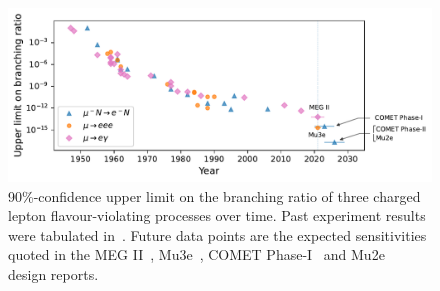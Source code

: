 \begin{figure}
    \centering
    \includegraphics[width=\textwidth]{chapter1/clfv_upper_limit_v2.pdf}
    \caption{
        90\%-confidence upper limit on the branching ratio of three charged
        lepton flavour-violating processes over time. Past experiment results
        were tabulated in~\cite{BERNSTEIN201327}. Future data points are the
        expected sensitivities quoted in the MEG II~\cite{Baldini2018},
        Mu3e~\cite{ARNDT2021165679}, COMET
        Phase-I~\cite{the_comet_collaboration_comet_2020} and
        Mu2e~\cite{bartoszek2015mu2e} design reports.
    }
    \label{fig:clfv_upper_limit}
\end{figure}
